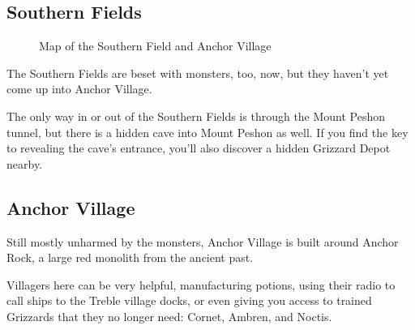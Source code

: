 \documentclass[10pt,twocolumn]{memoir}
\begin{document}
\subsection{Southern Fields}

\begin{figure*}[ht]
  \begin{center}
  \end{center}
  \caption{Map of the Southern Field and Anchor Village}
\end{figure*}

The Southern Fields are beset with monsters, too, now, but they haven't yet come
up into Anchor Village.

The  only  way  in  or  out  of   the  Southern  Fields  is  through  the  Mount
Peshon tunnel, but there is a hidden cave into Mount Peshon as well. If you find
the key to revealing the cave's entrance, you'll also discover a hidden Grizzard
Depot nearby.

\subsection{Anchor Village}

Still mostly  unharmed by the  monsters, Anchor  Village is built  around Anchor
Rock, a large red monolith from the ancient past.

Villagers here can be very helpful,  manufacturing potions, using their radio to
call ships  to the Treble  village docks, or even  giving you access  to trained
Grizzards that they no longer need: Cornet, Ambren, and Noctis.
\end{document}
